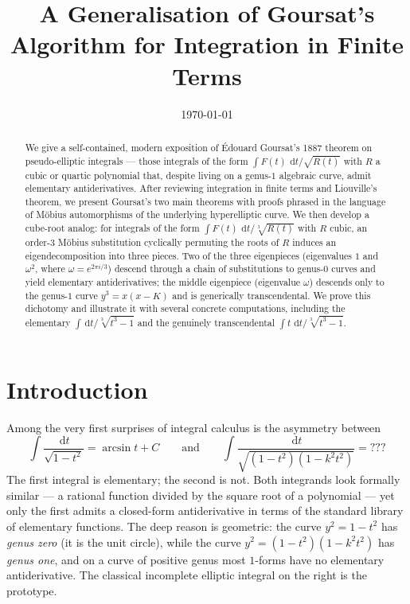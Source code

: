 \documentclass[11pt,a4paper]{article}
\title{\textbf{A Generalisation of Goursat's Algorithm for Integration in Finite Terms}}
\author{}
\date{\today}
\theoremstyle{plain}
\theoremstyle{definition}
\theoremstyle{remark}
\renewcommand{\d}{\,\mathrm{d}}
\begin{document}
\maketitle

\begin{abstract}
We give a self-contained, modern exposition of \'Edouard Goursat's 1887 theorem on pseudo-elliptic integrals --- those integrals of the form $\int F(t)\,\d t/\sqrt{R(t)}$ with $R$ a cubic or quartic polynomial that, despite living on a genus-$1$ algebraic curve, admit elementary antiderivatives. After reviewing integration in finite terms and Liouville's theorem, we present Goursat's two main theorems with proofs phrased in the language of M\"obius automorphisms of the underlying hyperelliptic curve. We then develop a cube-root analog: for integrals of the form $\int F(t)\,\d t/\sqrt[3]{R(t)}$ with $R$ cubic, an order-$3$ M\"obius substitution cyclically permuting the roots of $R$ induces an eigendecomposition into three pieces. Two of the three eigenpieces (eigenvalues $1$ and $\omega^2$, where $\omega = e^{2\pi i/3}$) descend through a chain of substitutions to genus-$0$ curves and yield elementary antiderivatives; the middle eigenpiece (eigenvalue $\omega$) descends only to the genus-$1$ curve $y^3 = x(x-K)$ and is generically transcendental. We prove this dichotomy and illustrate it with several concrete computations, including the elementary $\int \d t/\sqrt[3]{t^3-1}$ and the genuinely transcendental $\int t\,\d t/\sqrt[3]{t^3-1}$.
\end{abstract}

\section{Introduction}
\label{sec:intro}

Among the very first surprises of integral calculus is the asymmetry between
\[
  \int \frac{\d t}{\sqrt{1-t^2}} = \arcsin t + C
\qquad\text{and}\qquad
  \int \frac{\d t}{\sqrt{(1-t^2)(1-k^2t^2)}} = ???
\]
The first integral is elementary; the second is not. Both integrands look formally similar --- a rational function divided by the square root of a polynomial --- yet only the first admits a closed-form antiderivative in terms of the standard library of elementary functions. The deep reason is geometric: the curve $y^2 = 1 - t^2$ has \emph{genus zero} (it is the unit circle), while the curve $y^2 = (1-t^2)(1-k^2 t^2)$ has \emph{genus one}, and on a curve of positive genus most $1$-forms have no elementary antiderivative. The classical incomplete elliptic integral on the right is the prototype.
\end{document}
